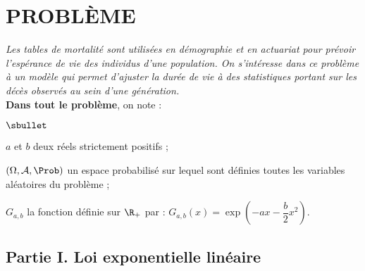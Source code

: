 \documentclass[11pt]{article}%
\begin{document}


\section*{PROBLÈME}

\noindent %
{\it Les tables de mortalité sont utilisées en démographie et en
  actuariat pour prévoir l'espérance de vie des individus d'une
  population. On s'intéresse dans ce problème à un modèle qui permet
  d'ajuster la durée de vie à des statistiques portant sur les décès
  observés au sein d'une génération.}\\
{\bf Dans tout le problème}, on note :
\begin{noliste}{$\sbullet$}
\item $a$ et $b$ deux réels strictement positifs ;
\item $(\Omega,\mathcal{A},\Prob)$ un espace probabilisé sur lequel sont
  définies toutes les variables aléatoires du problème ;
\item $G_{a,b}$ la fonction définie sur $\R_+$ par :
  $G_{a,b}(x)=\exp\left(-ax-\dfrac{b}{2}x^2\right)$.
\end{noliste}

\subsection*{Partie I. Loi exponentielle linéaire}
\end{document}
